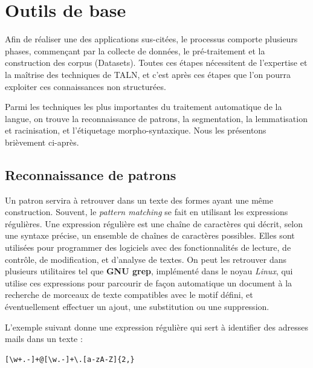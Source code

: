     
\section{Outils de base}
Afin de réaliser une des applications sus-citées, le processus comporte plusieurs phases, commençant par la collecte de données, le pré-traitement et la construction des corpus (Datasets). Toutes ces étapes nécessitent de l'expertise et la maîtrise des techniques de TALN, et c'est après ces étapes que l'on pourra exploiter ces connaissances non structurées.

Parmi les techniques les plus importantes du traitement automatique de la langue, on trouve la reconnaissance de patrons, la segmentation, la lemmatisation et racinisation, et l'étiquetage morpho-syntaxique. Nous les présentons brièvement ci-après.
    \subsection{Reconnaissance de patrons}
    Un patron servira à retrouver dans un texte des formes ayant une même construction. Souvent, le \emph{pattern matching} se fait en utilisant les expressions régulières. Une expression régulière est une chaîne de caractères qui décrit, selon une syntaxe précise, un ensemble de chaînes de caractères possibles. Elles sont utilisées pour programmer des logiciels avec des fonctionnalités de lecture, de contrôle, de modification, et d'analyse de textes. On peut les retrouver dans plusieurs utilitaires tel que \textbf{GNU grep}, implémenté dans le noyau \emph{Linux}, qui utilise ces expressions pour parcourir de façon automatique un document à la recherche de morceaux de texte compatibles avec le motif défini, et éventuellement effectuer un ajout, une substitution ou une suppression.

    L'exemple suivant donne une expression régulière qui sert à identifier des adresses mails dans un texte : 
    \begin{lstlisting}[style=code]
        [\w+.-]+@[\w.-]+\.[a-zA-Z]{2,}
    \end{lstlisting}

